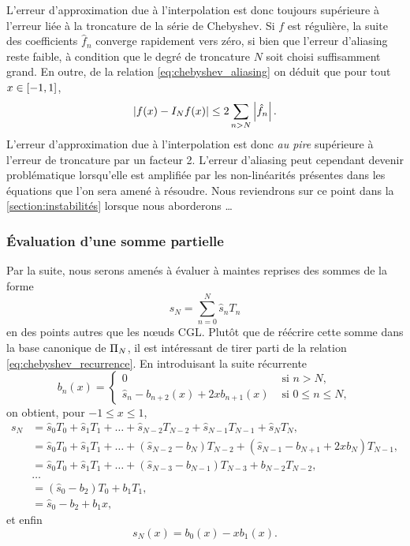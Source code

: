 L'erreur d'approximation due à l'interpolation est donc toujours supérieure à l'erreur liée à la troncature de la série de Chebyshev.
Si $f$ est régulière, la suite des coefficients $\hat{f}_n$ converge rapidement vers zéro, si bien que l'erreur d'aliasing reste faible, à condition que le degré de troncature $N$ soit choisi suffisamment grand.
En outre, de la relation \eqref{eq:chebyshev_aliasing} on déduit que pour tout $x \in \chebinterval$,
\begin{equation}
	\left| f(x) - \interpolant{f}{N}(x) \right| \leq 2 \sum_{n>N} \left| \hat{f}_n \right|.
\end{equation}
L'erreur d'approximation due à l'interpolation est donc \textit{au pire} supérieure à l'erreur de troncature par un facteur 2.
L'erreur d'aliasing peut cependant devenir problématique lorsqu'elle est amplifiée par les non-linéarités présentes dans les équations que l'on sera amené à résoudre. 
Nous reviendrons sur ce point dans la \autoref{section:instabilités} lorsque nous aborderons \ldots




\subsubsection{Évaluation d'une somme partielle}
Par la suite, nous serons amenés à évaluer à maintes reprises des sommes de la forme
\begin{equation}
	s_N = \sum_{n=0}^N \hat{s}_n T_n
	\label{eq:chebyshev_sum}
\end{equation}
en des points autres que les n\oe uds CGL.
Plutôt que de réécrire cette somme dans la base canonique de $\polyspace{N}$, il est intéressant de tirer parti de la relation \eqref{eq:chebyshev_recurrence}. 
En introduisant la suite récurrente
\begin{equation}
	b_n(x) = 
	\begin{cases}
	 0 & \text{\ si\ } n > N,   \\ 
	 \hat{s}_n - b_{n+2}(x) + 2x b_{n+1}(x) & \text{\ si\ } 0 \leq n \leq N,
	\end{cases}
\end{equation}
on obtient, pour $-1 \leq x \leq 1$,%
\def\px{}%
\begin{align*}
	s_N\px 
	&= \hat{s}_0 T_0\px + \hat{s}_1 T_1\px + \ldots + \hat{s}_{N-2} T_{N-2}\px + \hat{s}_{N-1} T_{N-1}\px + \hat{s}_N T_N\px, \\
	&= \hat{s}_0 T_0 \px
	+ \hat{s}_1 T_1 \px
	+ \ldots 
	+ \left(\hat{s}_{N-2} - b_{N}\px\right) T_{N-2} \px
	+ \left(\hat{s}_{N-1} - b_{N+1}\px + 2x b_{N}\px \right) T_{N-1}\px, \\
	&= \hat{s}_0 T_0 \px
	+ \hat{s}_1 T_1 \px
	+ \ldots 
	+ \left(\hat{s}_{N-3} - b_{N-1}\px\right) T_{N-3} \px
	+ b_{N-2}\px T_{N-2}\px, \\
	& \ldots\\
	&= \left( \hat{s}_0 - b_2\px \right) T_0\px + b_1\px T_1\px, \\
	&= \hat{s}_0 - b_2\px + b_1\px x,
\end{align*}
et enfin
\begin{equation}
	s_N(x) = b_0(x) - x b_1(x).
\end{equation}

